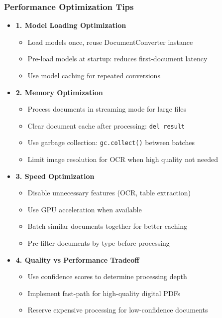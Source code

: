 \begin{frame}[fragile]\frametitle{Performance Optimization Tips}
      \begin{itemize}
        \item \textbf{1. Model Loading Optimization}
        \begin{itemize}
            \item Load models once, reuse DocumentConverter instance
            \item Pre-load models at startup: reduces first-document latency
            \item Use model caching for repeated conversions
        \end{itemize}
        \item \textbf{2. Memory Optimization}
        \begin{itemize}
            \item Process documents in streaming mode for large files
            \item Clear document cache after processing: \texttt{del result}
            \item Use garbage collection: \texttt{gc.collect()} between batches
            \item Limit image resolution for OCR when high quality not needed
        \end{itemize}
        \item \textbf{3. Speed Optimization}
        \begin{itemize}
            \item Disable unnecessary features (OCR, table extraction)
            \item Use GPU acceleration when available
            \item Batch similar documents together for better caching
            \item Pre-filter documents by type before processing
        \end{itemize}
        \item \textbf{4. Quality vs Performance Tradeoff}
        \begin{itemize}
            \item Use confidence scores to determine processing depth
            \item Implement fast-path for high-quality digital PDFs
            \item Reserve expensive processing for low-confidence documents
        \end{itemize}
      \end{itemize}
\end{frame}

